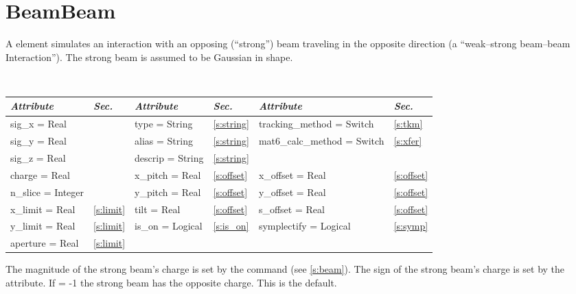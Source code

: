 \section{BeamBeam}
\label{s:bbi}

A  element simulates an interaction with an opposing
(``strong'') beam traveling in the opposite direction (a
``weak--strong beam--beam Interaction''). The strong beam is assumed
to be Gaussian in shape.

\toffset
\begin{center} 
\tt
\begin{tabular}{|l|l||l|l||l|l|} \hline
  {\sl Attribute} & {\sl Sec.}  & {\sl Attribute} & {\sl Sec.} & {\sl Attribute} & {\sl Sec.} \\ \hline
  sig\_x   = Real       &                 & type = String    & \ref{s:string} & tracking\_method = Switch    & \ref{s:tkm}    \\ \hline
  sig\_y   = Real       &                 & alias = String   & \ref{s:string} & mat6\_calc\_method = Switch  & \ref{s:xfer}   \\ \hline
  sig\_z   = Real       &                 & descrip = String & \ref{s:string} &                              &                \\ \hline
  charge   = Real       &                 & x\_pitch = Real  & \ref{s:offset} & x\_offset  = Real            & \ref{s:offset} \\ \hline
  n\_slice = Integer    &                 & y\_pitch = Real  & \ref{s:offset} & y\_offset  = Real            & \ref{s:offset} \\ \hline
  x\_limit = Real       & \ref{s:limit}   & tilt = Real      & \ref{s:offset} & s\_offset  = Real            & \ref{s:offset} \\ \hline
  y\_limit = Real       & \ref{s:limit}   & is\_on = Logical & \ref{s:is_on}  & symplectify = Logical        & \ref{s:symp}   \\ \hline
  aperture = Real       & \ref{s:limit}   &                  &                &                              &                \\ \hline
\end{tabular}
\end{center}
\toffset

The magnitude of the strong beam's charge is set by the 
command (see \ref{s:beam}).  The sign of the strong beam's charge is
set by the  attribute. If  = -1 the
strong beam has the opposite charge. This is the default.

